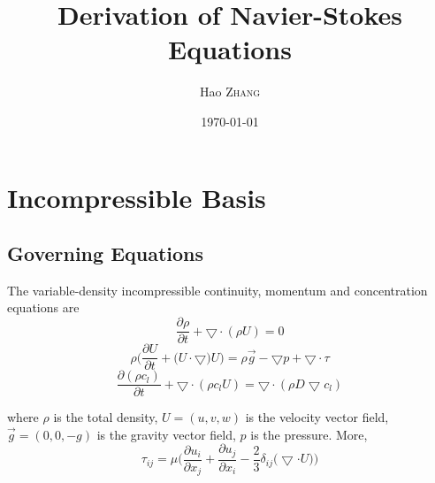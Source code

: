 \documentclass{article}
\title{Derivation of Navier-Stokes Equations} %
\author{Hao \textsc{Zhang}} %
\date{\today} %
\numberwithin{equation}{subsection}
\begin{document}
\maketitle %





\section{Incompressible Basis}



\subsection{Governing Equations}
The variable-density incompressible continuity, momentum and concentration equations are
\begin{equation}
    \frac{\partial \rho}{\partial t} + \bigtriangledown \cdot (\rho U) = 0
\end{equation}
\begin{equation}
    \rho \Bigg(\frac{\partial U}{\partial t} + \Big(U \cdot \bigtriangledown) U\Bigg) = \rho \vec{g} - \bigtriangledown p + \bigtriangledown  \cdot \tau
\end{equation}
\begin{equation}
    \frac{\partial (\rho c_l)}{\partial t} + \bigtriangledown
 \cdot ( \rho c_l U) = \bigtriangledown \cdot(\rho D \bigtriangledown c_l)
\end{equation}

where $\rho$ is the total density, $U = (u, v, w)$ is the velocity vector field, $\vec{g} = (0, 0, -g)$ is the gravity vector field, $p$ is the pressure.
More,
\begin{equation}
    \tau_{ij} = \mu \Bigg( \frac{\partial u_i}{\partial x_j} + \frac{\partial u_j}{\partial x_i} - \frac{2}{3} \delta_{ij} \Bigg(\bigtriangledown \cdot U\Bigg)\Bigg)
\end{equation}
\end{document}
